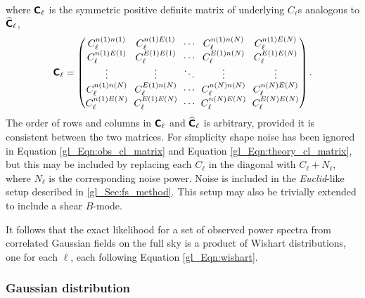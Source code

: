 where $\bm{\mathsf{C}}_\ell$ is the symmetric positive definite matrix of underlying $C_\ell$s analogous to $\widehat{\bm{\mathsf{C}}}_\ell$,
\begin{equation}
\mathbfss{C}_\ell =
\begingroup
\setlength\arraycolsep{3pt} %
\begin{pmatrix}
C_\ell^{n (1) n (1)} & C_\ell^{n (1) E (1)} & \cdots
& C_\ell^{n (1) n (N)} & C_\ell^{n (1) E (N)} \\
C_\ell^{n (1) E (1)} & C_\ell^{E (1) E (1)} & \cdots &
C_\ell^{E (1) n (N)} & C_\ell^{E (1) E (N)} \\
\vdots & \vdots & \ddots & \vdots & \vdots \\
C_\ell^{n (1) n(N)} & C_\ell^{E (1) n(N)} & \cdots &
C_\ell^{n (N) n (N)} & C_\ell^{n (N) E (N)} \\
C_\ell^{n (1) E(N)} & C_\ell^{E (1) E(N)} & \cdots & C_\ell^{n (N) E (N)} & C_\ell^{E (N) E (N)} \\
\end{pmatrix}.
\endgroup
\label{gl_Eqn:theory_cl_matrix}
\end{equation}
The order of rows and columns in $\bm{\mathsf{C}}_\ell$ and $\widehat{\bm{\mathsf{C}}}_\ell$ is arbitrary, provided it is consistent between the two matrices. For simplicity shape noise has been ignored in Equation \eqref{gl_Eqn:obs_cl_matrix} and Equation \eqref{gl_Eqn:theory_cl_matrix}, but this may be included by replacing each $C_\ell$ in the diagonal with $C_\ell + N_\ell$, where $N_\ell$ is the corresponding noise power. Noise is included in the \textit{Euclid}-like setup described in \autoref{gl_Sec:fs_method}. This setup may also be trivially extended to include a shear $B$-mode.

It follows that the exact likelihood for a set of observed power spectra from correlated Gaussian fields on the full sky is a product of Wishart distributions, one for each $\ell$, each following Equation \eqref{gl_Eqn:wishart}.

\subsubsection{Gaussian distribution}

